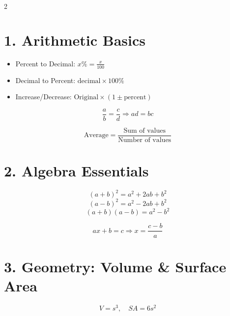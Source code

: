\documentclass[12pt]{article}
\begin{document}
\begin{multicols}{2}

\section*{1. Arithmetic Basics}

\begin{tcolorbox}[title=Percent and Decimal Conversion]
\begin{itemize}[left=0pt]
  \item Percent to Decimal: \( x\% = \frac{x}{100} \)
  \item Decimal to Percent: \( \text{decimal} \times 100\% \)
  \item Increase/Decrease: \( \text{Original} \times (1 \pm \text{percent}) \)
\end{itemize}
\end{tcolorbox}

\begin{tcolorbox}[title=Ratios and Proportions]
\[
\frac{a}{b} = \frac{c}{d} \Rightarrow ad = bc
\]
\end{tcolorbox}

\begin{tcolorbox}[title=Average Formula]
\[
\text{Average} = \frac{\text{Sum of values}}{\text{Number of values}}
\]
\end{tcolorbox}

\section*{2. Algebra Essentials}

\begin{tcolorbox}[title=Algebraic Identities]
\[
(a + b)^2 = a^2 + 2ab + b^2
\]
\[
(a - b)^2 = a^2 - 2ab + b^2
\]
\[
(a + b)(a - b) = a^2 - b^2
\]
\end{tcolorbox}

\begin{tcolorbox}[title=Solving Linear Equations]
\[
ax + b = c \Rightarrow x = \frac{c - b}{a}
\]
\end{tcolorbox}

\section*{3. Geometry: Volume \& Surface Area}

\begin{tcolorbox}[title=Cube]
\[
V = s^3, \quad SA = 6s^2
\]
\end{tcolorbox}


\end{multicols}
\end{document}
